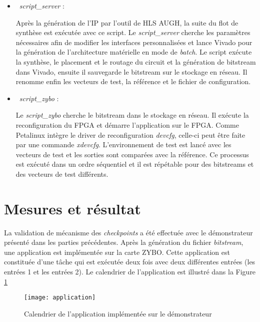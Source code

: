 \begin{itemize}
	\item\
	\emph{script\_server} :
	
	Après la génération de l'IP par l'outil de HLS AUGH, la suite du flot de synthèse est exécutée avec ce script. Le \emph{script\_server}
	cherche les paramètres nécessaires afin de modifier les interfaces personnalisées et lance Vivado pour la génération
	de l'architecture matérielle en mode de \emph{batch}. Le script exécute la synthèse, le placement et le routage du circuit et 
	la génération de bitstream dans Vivado, ensuite il sauvegarde le bitstream sur le stockage en réseau.
	Il renomme enfin les vecteurs de test, la référence et le fichier de configuration.

	\item\
	\emph{script\_zybo} :
	
	Le \emph{script\_zybo} cherche le bitstream dans le stockage en réseau. Il exécute la reconfiguration du FPGA et démarre
	l'application sur le FPGA. Comme Petalinux intègre le driver de reconfiguration \emph{devcfg}, celle-ci peut
	être faite par une commande \emph{xdevcfg}. L'environnement de test est lancé avec les vecteurs de test et les sorties
	sont comparées avec la référence. Ce processus est exécuté dans un ordre séquentiel et il est répétable pour des
	bitstreams et des vecteurs de test différents.
	
\end{itemize}

\section{Mesures et résultat} %

La validation de mécanisme des \emph{checkpoints} a été effectuée avec le démonstrateur présenté dans les parties précédentes.
Après la génération du fichier \emph{bitstream}, une application est implémentée sur la carte ZYBO. Cette application est constituée
d'une tâche qui est exécutée deux fois avec deux différentes entrées (les entrées 1 et les entrées 2). Le calendrier de l'application
est illustré dans la Figure \ref{fig:application}

\begin{figure}[h]
	\centering
	\texttt{[image: application]}
	\caption{Calendrier de l'application implémentée sur le démonstrateur}
	\label{fig:application}
	\vspace{-2mm}
\end{figure}

